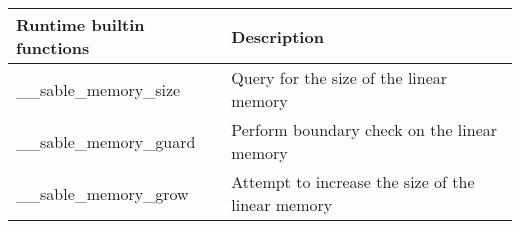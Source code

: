 \begin{tabular}{|l|l|}
    \hline
    \textbf{Runtime builtin functions} & \textbf{Description}                              \\ \hline
    \_\_sable\_memory\_size            & Query for the size of the linear memory           \\ \hline
    \_\_sable\_memory\_guard           & Perform boundary check on the linear memory       \\ \hline
    \_\_sable\_memory\_grow            & Attempt to increase the size of the linear memory \\ \hline
\end{tabular}